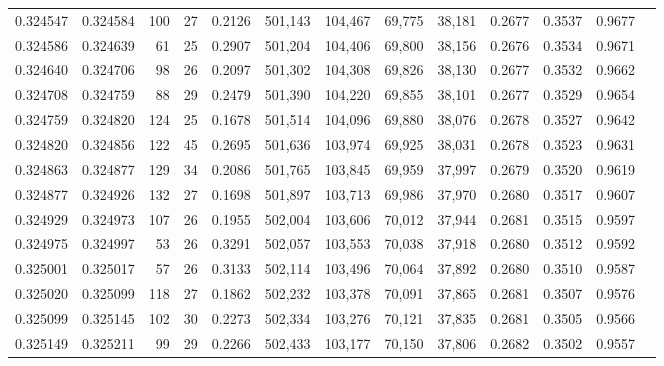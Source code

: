\begin{tabular}{rrrrrrrrrrrrr}
0.324547 & 0.324584 &   100 &  27 &                                     0.2126 & 501,143 & 104,467 &  69,775 &  38,181 & 0.2677 & 0.3537 & 0.9677 \\
0.324586 & 0.324639 &    61 &  25 &                                     0.2907 & 501,204 & 104,406 &  69,800 &  38,156 & 0.2676 & 0.3534 & 0.9671 \\
0.324640 & 0.324706 &    98 &  26 &                                     0.2097 & 501,302 & 104,308 &  69,826 &  38,130 & 0.2677 & 0.3532 & 0.9662 \\
0.324708 & 0.324759 &    88 &  29 &                                     0.2479 & 501,390 & 104,220 &  69,855 &  38,101 & 0.2677 & 0.3529 & 0.9654 \\
0.324759 & 0.324820 &   124 &  25 &                                     0.1678 & 501,514 & 104,096 &  69,880 &  38,076 & 0.2678 & 0.3527 & 0.9642 \\
0.324820 & 0.324856 &   122 &  45 &                                     0.2695 & 501,636 & 103,974 &  69,925 &  38,031 & 0.2678 & 0.3523 & 0.9631 \\
0.324863 & 0.324877 &   129 &  34 &                                     0.2086 & 501,765 & 103,845 &  69,959 &  37,997 & 0.2679 & 0.3520 & 0.9619 \\
0.324877 & 0.324926 &   132 &  27 &                                     0.1698 & 501,897 & 103,713 &  69,986 &  37,970 & 0.2680 & 0.3517 & 0.9607 \\
0.324929 & 0.324973 &   107 &  26 &                                     0.1955 & 502,004 & 103,606 &  70,012 &  37,944 & 0.2681 & 0.3515 & 0.9597 \\
0.324975 & 0.324997 &    53 &  26 &                                     0.3291 & 502,057 & 103,553 &  70,038 &  37,918 & 0.2680 & 0.3512 & 0.9592 \\
0.325001 & 0.325017 &    57 &  26 &                                     0.3133 & 502,114 & 103,496 &  70,064 &  37,892 & 0.2680 & 0.3510 & 0.9587 \\
0.325020 & 0.325099 &   118 &  27 &                                     0.1862 & 502,232 & 103,378 &  70,091 &  37,865 & 0.2681 & 0.3507 & 0.9576 \\
0.325099 & 0.325145 &   102 &  30 &                                     0.2273 & 502,334 & 103,276 &  70,121 &  37,835 & 0.2681 & 0.3505 & 0.9566 \\
0.325149 & 0.325211 &    99 &  29 &                                     0.2266 & 502,433 & 103,177 &  70,150 &  37,806 & 0.2682 & 0.3502 & 0.9557 \\

\end{tabular}

